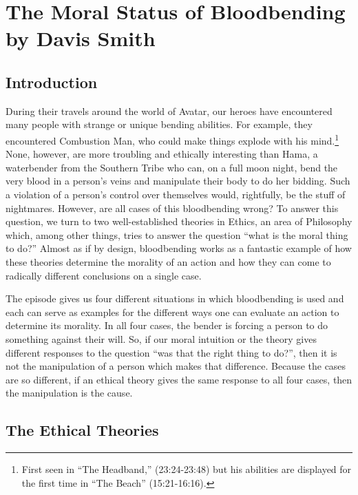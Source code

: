 \chapter{The Moral Status of Bloodbending by Davis Smith}
\section{Introduction}

During their travels around the world of Avatar, our heroes have encountered many people with strange or unique bending abilities. For example, they encountered Combustion Man, who could make things explode with his mind.\footnote{First seen in “The Headband,” (23:24-23:48) but his abilities are displayed for the first time in “The Beach” (15:21-16:16).} None, however, are more troubling and ethically interesting than Hama, a waterbender from the Southern Tribe who can, on a full moon night, bend the very blood in a person’s veins and manipulate their body to do her bidding.\autocite{puppetmaster} Such a violation of a person’s control over themselves would, rightfully, be the stuff of nightmares. However, are all cases of this bloodbending wrong? To answer this question, we turn to two well-established theories in Ethics, an area of Philosophy which, among other things, tries to answer the question “what is the moral thing to do?” Almost as if by design, bloodbending works as a fantastic example of how these theories determine the morality of an action and how they can come to radically different conclusions on a single case.

The episode gives us four different situations in which bloodbending is used and each can serve as examples for the different ways one can evaluate an action to determine its morality. In all four cases, the bender is forcing a person to do something against their will. So, if our moral intuition or the theory gives different responses to the question “was that the right thing to do?”, then it is not the manipulation of a person which makes that difference. Because the cases are so different, if an ethical theory gives the same response to all four cases, then the manipulation is the cause.

\section{The Ethical Theories}

